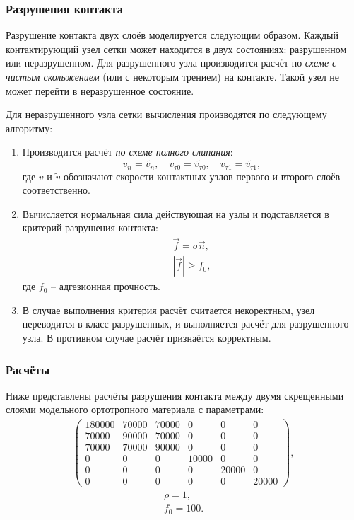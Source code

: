 \subsubsection{Разрушения контакта}

	Разрушение контакта двух слоёв моделируется следующим образом.
	Каждый контактирующий узел сетки может находится в двух состояниях: разрушенном или неразрушенном.
	Для разрушенного узла производится расчёт по \textit{схеме с чистым скольжением} (или с некоторым трением) на контакте. 
	Такой узел не может перейти в неразрушенное состояние.
	
	Для неразрушенного узла сетки вычисления производятся по следующему алгоритму:
	
\begin{enumerate}
	\item Производится расчёт \textit{по схеме полного слипания}:
	\begin{equation}
		v_n = \widetilde{v_n}, \quad v_{\tau0} = \widetilde{v_{\tau0}}, \quad v_{\tau1} = \widetilde{v_{\tau1}},
	\end{equation}
		где $v$ и $\widetilde{v}$ обозначают скорости контактных узлов первого и второго слоёв соответственно.
	\item Вычисляется нормальная сила действующая на узлы и подставляется в критерий разрушения контакта:
	\begin{align}
		\vec{f} = \sigma \vec{n}, \\
		|\vec{f}| \geq f_0,
	\end{align}
		где $f_0$ -- адгезионная прочность.
	\item В случае выполнения критерия расчёт считается некоректным, узел переводится в класс разрушенных, и выполняется расчёт для разрушенного узла. В противном случае расчёт признаётся корректным.
\end{enumerate}
	
\subsubsection{Расчёты}

	Ниже представлены расчёты разрушения контакта между двумя скрещенными слоями модельного ортотропного материала с параметрами: 
\begin{align}
\label{delamination_model_mat}
\left( \begin{array}{cccccccccccc}
180000 & 70000 & 70000 & 0 & 0 & 0 \\ 
70000 & 90000 & 70000 & 0 & 0 & 0 \\ 
70000 & 70000 & 90000 & 0 & 0 & 0 \\ 
0 & 0 & 0 & 10000 & 0 & 0 \\ 
0 & 0 & 0 & 0 & 20000 & 0 \\ 
0 & 0 & 0 & 0 & 0 & 20000
\end{array} \right),
\end{align}	
\begin{align}
	\rho = 1,\\
	f_0 = 100.
\end{align}
	
